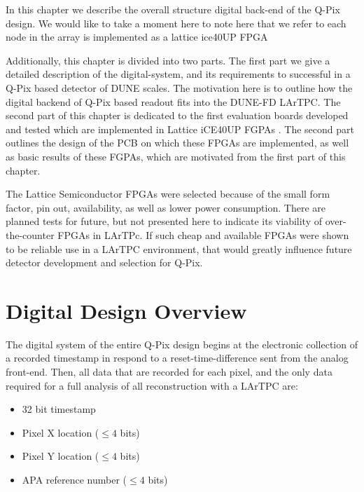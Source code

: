 In this chapter we describe the overall structure digital back-end of the Q-Pix design.
We would like to take a moment here to note here that we refer to each node in the array is implemented as a lattice ice40UP FPGA 

Additionally, this chapter is divided into two parts. 
The first part we give a detailed description of the digital-system, and its requirements to successful in a Q-Pix based detector of DUNE scales.
The motivation here is to outline how the digital backend of Q-Pix based readout fits into the DUNE-FD LArTPC. 
The second part of this chapter is dedicated to the first evaluation boards developed and tested which are implemented in Lattice iCE40UP FGPAs \citep{lattice_ice40up_datasheet}.
The second part outlines the design of the PCB on which these FPGAs are implemented, as well as basic results of these FGPAs, which are motivated from the first part of this chapter.

The Lattice Semiconductor FPGAs \citep{lattice_ice40up_datasheet} were selected because of the small form factor, pin out, availability, as well as lower power consumption.
There are planned tests for future, but not presented here to indicate its viability of over-the-counter FPGAs in LArTPc. 
If such cheap and available FPGAs were shown to be reliable use in a LArTPC environment, that would greatly influence future detector development and selection for Q-Pix.

\section{Digital Design Overview}

The digital system of the entire Q-Pix design begins at the electronic collection of a recorded timestamp in respond to a reset-time-difference sent from the analog front-end.
Then, all data that are recorded for each pixel, and the only data required for a full analysis of all reconstruction with a LArTPC are:

\begin{itemize}
    \item 32 bit timestamp
    \item Pixel X location ($\le 4$ bits)
    \item Pixel Y location ($\le 4$ bits)
    \item APA reference number ($\le 4$ bits)
\end{itemize}
\label{bit_calc}


